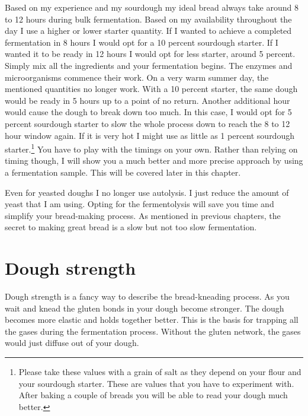 Based on my experience and my sourdough my ideal bread always take around 8
to 12 hours during bulk fermentation. Based on my availability throughout
the day I use a higher or lower starter quantity. If I wanted to achieve a completed
fermentation in 8 hours I would opt for a 10 percent sourdough starter. If I
wanted it to be ready in 12 hours I would opt for less starter, around 5 percent.
Simply mix all the ingredients and your fermentation begins. The
enzymes and microorganisms commence their work. On a very warm summer day, the
mentioned quantities no longer work. With a 10 percent starter, the same dough
would be ready in 5 hours up to a point of no return. Another additional hour
would cause the dough to break down too much. In this case, I would opt for 5
percent sourdough starter to slow the whole process down to reach the 8 to 12
hour window again. If it is very hot I might use as little as 1 percent
sourdough starter.\footnote{Please take these values with a grain of salt as
they depend on your flour and your sourdough starter. These are values that
you have to experiment with. After baking a couple of breads you will be able
to read your dough much better.} You have to play with the timings on your own.
Rather than relying on timing though, I will show you a much better and more precise approach
by using a fermentation sample. This will be covered later in this chapter.

Even for yeasted doughs I no longer use autolysis. I just reduce the amount
of yeast that I am using. Opting for the fermentolysis will
save you time and simplify your bread-making process. As mentioned in previous chapters,
the secret to making great bread is a slow but not too slow fermentation.

\section{Dough strength}

Dough strength is a fancy way to describe the bread-kneading process. As you wait and
knead the gluten bonds in your dough become stronger. The dough
becomes more elastic and holds together better. This is the basis for trapping
all the gases during the fermentation process. Without the gluten network,
the gases would just diffuse out of your dough.

